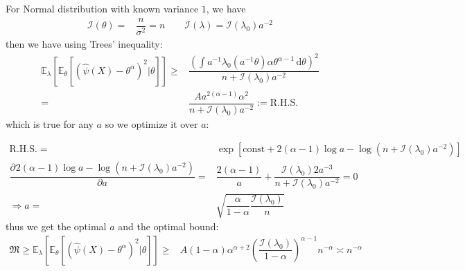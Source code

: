 \documentclass[11pt,a4paper]{ctexart}
\numberwithin{equation}{section}%
\begin{document}
    

\subsection{}


For Normal distribution with known variance $ 1 $, we have
\begin{align*}
    \mathcal{I}(\theta )=& \dfrac{ n }{ \sigma ^2 }  =  n\qquad \mathcal{I}(\lambda )=\mathcal{I}(\lambda _0)a^{-2}
\end{align*}
then we have using Trees' inequality:
\begin{align*}
    \mathbb{E}_\lambda \left[ \mathbb{E}_\theta \left[ (\hat{\psi}(X)-\theta ^\alpha )^2 |\theta  \right]  \right] \geq&\dfrac{ \left( \int a^{-1}\lambda _0(a^{-1}\theta )\alpha \theta ^{\alpha -1}\,\mathrm{d}\theta  \right)^2 }{ n + \mathcal{I}(\lambda _0)a^{-2} }\\
    =&\dfrac{ Aa^{2(\alpha -1)}\alpha ^2 }{ n + \mathcal{I}(\lambda _0)a^{-2} } :=  \mathrm{R.H.S.}
\end{align*}
which is true for any $ a $ so we optimize it over $ a $:

\begin{align*}
     \mathrm{R.H.S.}=& \exp\left[ \mathrm{const}+2(\alpha -1)\log a - \log(n+\mathcal{I}(\lambda _0)a^{-2}) \right]\\
    \dfrac{\partial^{} 2(\alpha -1)\log a - \log(n+\mathcal{I}(\lambda _0)a^{-2})  }{\partial a^{} }=& \dfrac{ 2(\alpha -1) }{ a } + \dfrac{ \mathcal{I}(\lambda _0)2a^{-3} }{ n+\mathcal{I}(\lambda _0)a^{-2} } = 0\\
     \Rightarrow a=&\sqrt{\dfrac{ \alpha  }{ 1-\alpha  } \dfrac{ \mathcal{I}(\lambda _0) }{ n } }
\end{align*}
thus we get the optimal $ a $ and the optimal bound:
\begin{align*}
    \mathfrak{M}\geq \mathbb{E}_\lambda \left[ \mathbb{E}_\theta \left[ (\hat{\psi}(X)-\theta ^\alpha )^2 |\theta  \right]  \right] \geq&A(1-\alpha )\alpha ^{\alpha +2}\left(\dfrac{ \mathcal{I}(\lambda _0) }{ 1-\alpha  } \right)^{\alpha -1}n^{-\alpha } \asymp n^{-\alpha }
\end{align*}

\subsection{}
\end{document}

